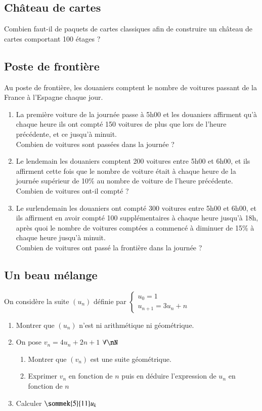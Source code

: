 \documentclass[oneside,12pt]{article}          %
\begin{document}
\subsection{Château de cartes}
Combien faut-il de paquets de cartes classiques afin de construire un château de cartes comportant 100 étages ?



\subsection{Poste de frontière}
Au poste de frontière, les douaniers comptent le nombre de voitures passant de la France à l'Espagne chaque jour.
\begin{enumerate}
	\item La première voiture de la journée passe à 5h00 et les douaniers affirment qu'à chaque heure ils ont compté 150 voitures de plus que lors de l'heure précédente, et ce jusqu'à minuit.\\
	Combien de voitures sont passées dans la journée ?
	\item Le lendemain les douaniers comptent 200 voitures entre 5h00 et 6h00, et ils affirment cette fois que le nombre de voiture était à chaque heure de la journée supérieur de 10\% au nombre de voiture de l'heure précédente.\\
	Combien de voitures ont-il compté ?
	\item Le surlendemain les douaniers ont compté 300 voitures entre 5h00 et 6h00, et ils affirment en avoir compté 100 supplémentaires à chaque heure jusqu'à 18h, après quoi le nombre de voitures comptées a commencé à diminuer de 15\% à chaque heure jusqu'à minuit.\\
	Combien de voitures ont passé la frontière dans la journée ?
\end{enumerate}



\subsection{Un beau mélange}
On considère la suite $(u_n)$ définie par $\begin{cases}u_0=1\\u_{n+1}=3u_n+n\end{cases}$
\begin{enumerate}
	\item Montrer que $(u_n)$ n'est ni arithmétique ni géométrique.
	\item On pose $v_n=4u_n+2n+1$ \quad $\forall\nN$
	\begin{enumerate}
		\item Montrer que $(v_n)$ est une suite géométrique.
		\item Exprimer $v_n$ en fonction de $n$ puis en déduire l'expression de $u_n$ en fonction de $n$
	\end{enumerate}
	\item Calculer $\sommek{5}{11}u_k$
\end{enumerate}
\end{document}

